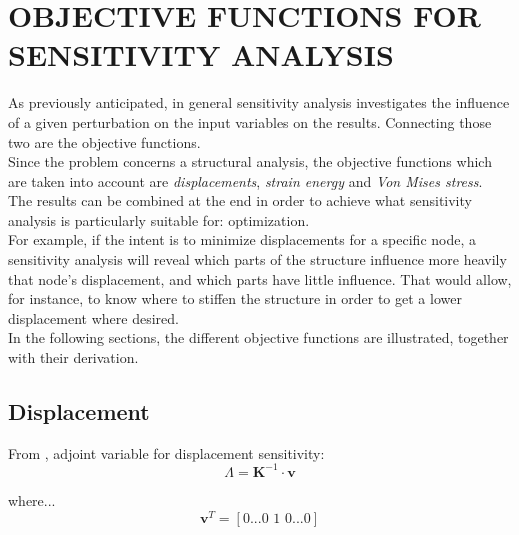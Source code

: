 \section{OBJECTIVE FUNCTIONS FOR SENSITIVITY ANALYSIS} \label{section:ObjectiveFunctions}
As previously anticipated, in general sensitivity analysis investigates the influence of a given perturbation on the input variables on the results. Connecting those two are the objective functions. \\[3pt]
Since the problem concerns a structural analysis, the objective functions which are taken into account are \textit{displacements}, \textit{strain energy} and \textit{Von Mises stress}.\\[3pt]
The results can be combined at the end in order to achieve what sensitivity analysis is particularly suitable for: optimization. \\[3pt]
For example, if the intent is to minimize displacements for a specific node, a sensitivity analysis will reveal which parts of the structure influence more heavily that node's displacement, and which parts have little influence. That would allow, for instance, to know where to stiffen the structure in order to get a lower displacement where desired. \\[3pt]
In the following sections, the different objective functions are illustrated, together with their derivation.

\subsection{Displacement}

From \cite{masching_dissertation}, adjoint variable for displacement sensitivity:
\begin{equation}
\Lambda = \textbf{K}^{-1}\cdot\textbf{v}
\label{}
\end{equation}

where...
\begin{equation}
\textbf{v}^T=[0 ...0\,\,1\,\,0...0]
\label{}
\end{equation}

